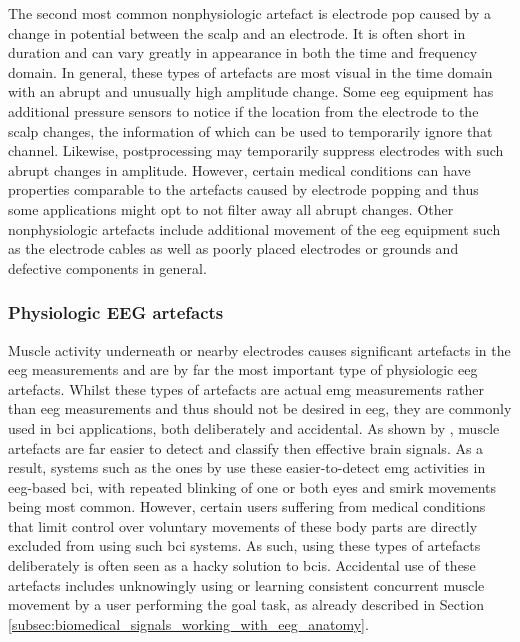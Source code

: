 The second most common nonphysiologic artefact is electrode pop caused by a change in potential between the scalp and an electrode.
It is often short in duration and can vary greatly in appearance in both the time and frequency domain.
In general, these types of artefacts are most visual in the time domain with an abrupt and unusually high amplitude change.
Some \gls{eeg} equipment has additional pressure sensors to notice if the location from the electrode to the scalp changes, the information of which can be used to temporarily ignore that channel.
Likewise, postprocessing may temporarily suppress electrodes with such abrupt changes in amplitude.
However, certain medical conditions can have properties comparable to the artefacts caused by electrode popping and thus some applications might opt to not filter away all abrupt changes.
Other nonphysiologic artefacts include additional movement of the \gls{eeg} equipment such as the electrode cables as well as poorly placed electrodes or grounds and defective components in general.


\subsubsection{Physiologic EEG artefacts}
\label{subsubsec:biomedical_signals_working_with_eeg_artefacts_physiologic}

Muscle activity underneath or nearby electrodes causes significant artefacts in the \gls{eeg} measurements and are by far the most important type of physiologic \gls{eeg} artefacts.
Whilst these types of artefacts are actual \gls{emg} measurements rather than \gls{eeg} measurements and thus should not be desired in \gls{eeg}, they are commonly used in \gls{bci} applications, both deliberately and accidental.
As shown by \citet{using_emg_in_eeg_artefact}, muscle artefacts are far easier to detect and classify then effective brain signals.
As a result, systems such as the ones by \citet{eeg_fnirs_drone} use these easier-to-detect \gls{emg} activities in \gls{eeg}-based \gls{bci}, with repeated blinking of one or both eyes and smirk movements being most common.
However, certain users suffering from medical conditions that limit control over voluntary movements of these body parts are directly excluded from using such \gls{bci} systems.
As such, using these types of artefacts deliberately is often seen as a hacky solution to \glspl{bci}.
Accidental use of these artefacts includes unknowingly using or learning consistent concurrent muscle movement by a user performing the goal task, as already described in Section \ref{subsec:biomedical_signals_working_with_eeg_anatomy}.

